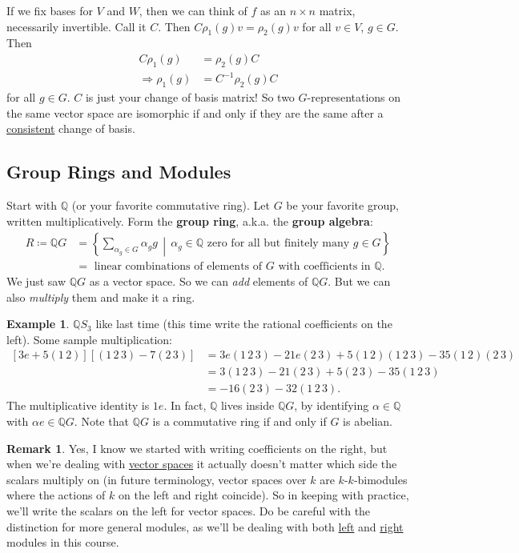 \documentclass[12pt]{article}
\newcommand{\q}{\mathbb{Q}}
\newcommand{\ita}[1]{\textit{#1}}
\newcommand\inv[1]{#1^{-1}}
\theoremstyle{definition}
\newtheorem*{remark}{Remark}
\newtheorem{example}{Example}[section]
\begin{document}
If we fix bases for $V$ and $W$, then we can think of $f$ as an $n\times n$ matrix, necessarily invertible. Call it $C$. Then $C\rho_1(g)v=\rho_2(g)v$ for all $v\in V$, $g\in G$. Then
\begin{equation}
    \begin{split}
        C\rho_1(g)&=\rho_2(g)C\\
        \Rightarrow\rho_1(g)&=\inv{C}\rho_2(g)C
    \end{split}
\end{equation}
for all $g\in G$. $C$ is just your change of basis matrix! So two $G$-representations on the same vector space are isomorphic if and only if they are the same after a \underline{consistent} change of basis.
\subsection{Group Rings and Modules}
Start with $\q$ (or your favorite commutative ring). Let $G$ be your favorite group, written multiplicatively. Form the \textbf{group ring}, a.k.a. the \textbf{group algebra}:
\begin{equation}
    \begin{split}
        R\coloneqq \q G&=\left\{\sum\limits_{\alpha_g\in G}\alpha_gg\,\middle|\,\alpha_g\in\q\text { zero for all but finitely many }g\in G\right\}\\
        &=\text{ linear combinations of elements of $G$ with coefficients in $\q$.}
    \end{split}
\end{equation}
We just saw $\q G$ as a vector space. So we can \ita{add} elements of $\q G$. But we can also \ita{multiply} them and make it a ring.
\begin{example}
    $\q S_3$ like last time (this time write the rational coefficients on the left). Some sample multiplication:
    \begin{equation}
        \begin{split}
            \left[3e+5(1\,2)\right]\left[(1\,2\,3)-7(2\,3)\right]&=3e(1\,2\,3)-21e(2\,3)+5(1\,2)(1\,2\,3)-35(1\,2)(2\,3)\\
            &=3(1\,2\,3)-21(2\,3)+5(2\,3)-35(1\,2\,3)\\
            &=\boxed{-16(2\,3)-32(1\,2\,3).}
        \end{split}
    \end{equation}
    The multiplicative identity is $1e$. In fact, $\q$ lives inside $\q G$, by identifying $\alpha\in\q$ with $\alpha e\in\q G$. Note that $\q G$ is a commutative ring if and only if $G$ is abelian.
\end{example}
\begin{remark}
    Yes, I know we started with writing coefficients on the right, but when we're dealing with \underline{vector spaces} it actually doesn't matter which side the scalars multiply on (in future terminology, vector spaces over $k$ are $k$-$k$-bimodules where the actions of $k$ on the left and right coincide). So in keeping with practice, we'll write the scalars on the left for vector spaces. Do be careful with the distinction for more general modules, as we'll be dealing with both \underline{left} and \underline{right} modules in this course.
\end{remark}
\end{document}
